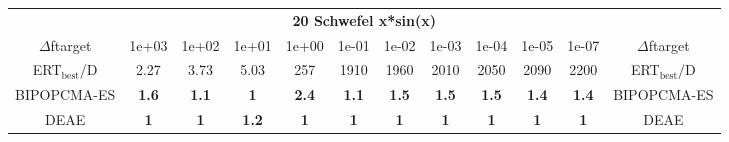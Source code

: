\begin{tabular}{cccccccccccc}
 & \multicolumn{10}{c}{{\normalsize \textbf{20 Schwefel x*sin(x)}}}\\
$\Delta$ftarget& 1e+03& 1e+02& 1e+01& 1e+00& 1e-01& 1e-02& 1e-03& 1e-04& 1e-05& 1e-07 & $\Delta$ftarget \\
ERT$_{\textrm{best}}$/D& 2.27& 3.73& 5.03& 257& 1910& 1960& 2010& 2050& 2090& 2200 & ERT$_{\textrm{best}}$/D \\
\hline
BIPOPCMA-ES & \textbf{1.6} & \textbf{1.1} & \textbf{1} & \textbf{2.4} & \textbf{1.1} & \textbf{1.5} & \textbf{1.5} & \textbf{1.5} & \textbf{1.4} & \textbf{1.4} & BIPOPCMA-ES \cite{add_an_entry_for_BIPOPCMA-ES_in_bbob.bib}\\
DEAE & \textbf{1} & \textbf{1} & \textbf{1.2} & \textbf{1} & \textbf{1} & \textbf{1} & \textbf{1} & \textbf{1} & \textbf{1} & \textbf{1} & DEAE \cite{add_an_entry_for_DEAE_in_bbob.bib}
\end{tabular}
